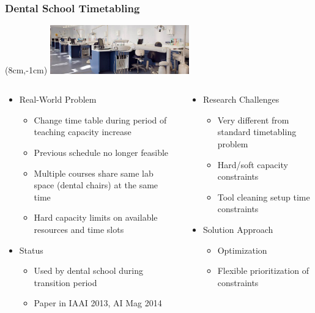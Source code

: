 \begin{frame}
\frametitle{Dental School Timetabling}
\begin{textblock*}{6cm}(8cm,-1cm)
\includegraphics[width=6cm]{images/OrthoClinic}
\end{textblock*}
\begin{columns}[b]
\begin{column}{0.5\textwidth}
\begin{itemize}
\item Real-World Problem
\begin{itemize}
\item Change time table during period of teaching capacity increase
\item Previous schedule no longer feasible
\item Multiple courses share same lab space (dental chairs) at the same time
\item Hard capacity limits on available resources and time slots
\end{itemize}
\item Status
\begin{itemize}
\item Used by dental school during transition period
\item Paper in IAAI 2013, AI Mag 2014
\end{itemize}
\end{itemize}
\end{column}
\begin{column}{0.5\textwidth}
\begin{itemize}
\item Research Challenges
\begin{itemize}
\item Very different from standard timetabling problem
\item Hard/soft capacity constraints
\item Tool cleaning setup time constraints
\end{itemize}
\item Solution Approach
\begin{itemize}
\item Optimization
\item Flexible prioritization of constraints
\end{itemize}
\end{itemize}
\end{column}
\end{columns}
\end{frame}

